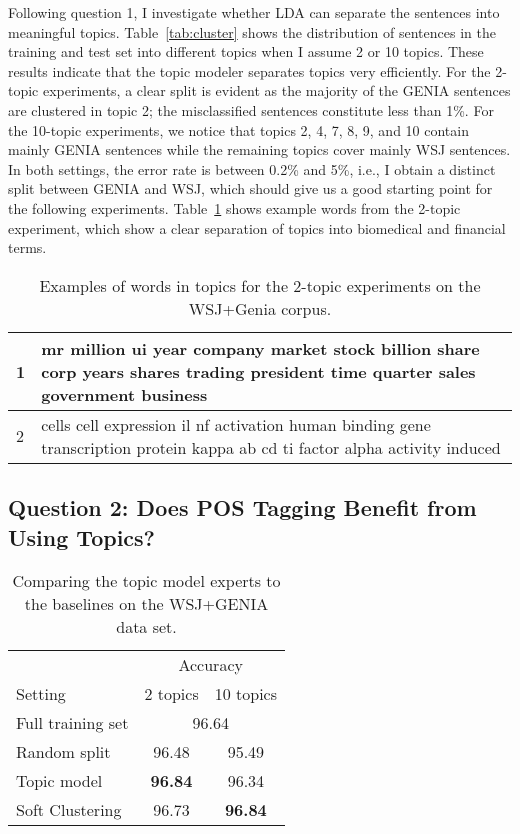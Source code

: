 Following question 1, I investigate whether LDA can separate the sentences into meaningful topics. 
Table~\ref{tab:cluster} shows the distribution of sentences in the training and test set into different topics when I assume 2 or 10 topics. These results indicate that the topic modeler separates topics very efficiently. For the 2-topic experiments, a clear split is evident as the majority of the GENIA sentences are clustered in topic 2; the misclassified sentences constitute less than 1\%. 
For the 10-topic experiments, we notice that topics 2, 4, 7, 8, 9, and 10 contain mainly GENIA sentences while the remaining topics cover mainly WSJ sentences. In both settings,  the error rate is between 0.2\% and 5\%, i.e., I obtain a distinct split between GENIA and WSJ, which should give us a good starting point for the following experiments. Table~\ref{tab:ex:2topics} shows example words from the 2-topic experiment, which show a clear separation of topics into biomedical and financial terms.


\begin{table}[t!]
	\begin{tabular}{l|p{14cm}} 
	    1 & mr million ui year company market stock billion share corp years shares trading president time quarter sales government business \\ \hline 
		2 & cells cell expression il nf activation human binding gene  transcription protein kappa ab cd ti factor alpha activity induced     \\ \hline
		
	\end{tabular}
	\caption{Examples of words in topics for the 2-topic experiments on the WSJ+Genia corpus.}
	\label{tab:ex:2topics}
\end{table}

\subsection*{Question 2: Does POS Tagging Benefit from Using Topics?}

\begin{table}[t]
\centering
\begin{tabular}{l|cc}
 & \multicolumn{2}{c}{Accuracy} \\
Setting & \multicolumn{1}{r}{2 topics} & \multicolumn{1}{r}{10 topics} \\ \hline
Full training set & \multicolumn{2}{c}{96.64} \\
Random split & 96.48 & 95.49 \\
Topic model & \textbf{96.84} & 96.34 \\
Soft Clustering & 96.73 & \textbf{96.84} \\ \hline
\end{tabular}
\caption{Comparing the topic model experts to the baselines on the WSJ+GENIA data set.\label{tab:mixedresults}}
\end{table}


